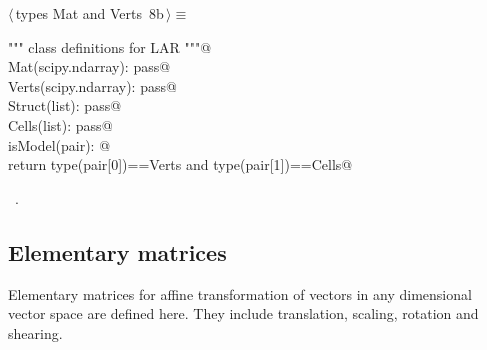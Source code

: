 \documentclass[11pt,oneside]{article}	%
\begin{document}
\begin{flushleft} \small \label{scrap18}
\protect{}$\langle\,$types Mat and Verts\nobreak\ {\footnotesize 8b}$\,\rangle\equiv$
\vspace{-1ex}
\begin{list}{}{} \item
\mbox{}\verb@""" class definitions for LAR """@\\
\mbox{}\verb@class Mat(scipy.ndarray): pass@\\
\mbox{}\verb@class Verts(scipy.ndarray): pass@\\
\mbox{}\verb@class Struct(list): pass@\\
\mbox{}\verb@class Cells(list): pass@\\
\mbox{}\verb@def isModel(pair): @\\
\mbox{}\verb@   return type(pair[0])==Verts and type(pair[1])==Cells@\\
\mbox{}\verb@@{\NWsep}
\end{list}
\vspace{-1ex}
\footnotesize\addtolength{\baselineskip}{-1ex}
\begin{list}{}{\setlength{\itemsep}{-\parsep}\setlength{\itemindent}{-\leftmargin}}
\item \NWtxtMacroRefIn\ .
\end{list}
\end{flushleft}

\subsection{Elementary matrices}
Elementary matrices for affine transformation of vectors in any dimensional vector space are defined here. They include translation, scaling, rotation and shearing. 
\end{document}
